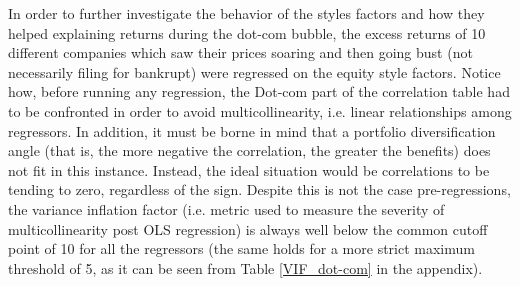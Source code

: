 \documentclass[12pt]{article}
\begin{document}
In order to further investigate the behavior of the styles factors and how they helped explaining returns during the dot-com bubble, the excess returns of 10 different companies which saw their prices soaring and then going bust (not necessarily filing for bankrupt) were regressed on the equity style factors. Notice how, before running any regression, the Dot-com part of the correlation table had to be confronted in order to avoid multicollinearity, i.e. linear relationships among regressors. In addition, it must be borne in mind that a portfolio diversification angle (that is, the more negative the correlation, the greater the benefits) does not fit in this instance. Instead, the ideal situation would be correlations to be tending to zero, regardless of the sign. Despite this is not the case pre-regressions, the variance inflation factor (i.e. metric used to measure the severity of multicollinearity post OLS regression) is always well below the common cutoff point of 10 for all the regressors (the same holds for a more strict maximum threshold of 5, as it can be seen from Table \ref{VIF_dot-com} in the appendix). \\
\end{document}
